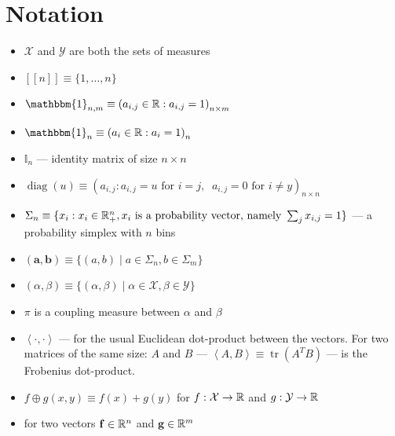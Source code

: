 \section*{Notation}

\begin{itemize}
  \item $\mathcal{X}$ and $\mathcal{Y}$ are both the sets of measures
  \item $[[ n ]] \equiv \{ 1, \ldots, n \}$
  \item $\mathbbm{1}_{n, m} \equiv \left( a_{i,j} \in \R : a_{i,j} = 1 \right)_{n \times m}$
  \item $\mathbbm{1}_{n} \equiv \left( a_{i} \in \R : a_{i} = 1 \right)_{n}$
  \item $\mathbb{I}_n$ --- identity matrix of size $n\times n$
  \item $\operatorname{diag}\left( u \right) \equiv \left( a_{i,j} : a_{i,j} = u \text{ for } i = j , \;\; a_{i,j} = 0 \text{ for } i \neq y \right)_{n \times n}$
  \item $\Sigma_n \equiv \{ x_i : x_i \in \mathbb{R}^{n}_+, x_i \text{ is a probability vector, namely } \sum_j x_{i, j} = 1 \}$ --- a probability simplex with $n$ bins
  \item $\left( \mathbf{a}, \mathbf{b} \right) \equiv \{ \left( a, b \right) \mid a \in \Sigma_n, b \in \Sigma_m  \}  $ 
  \item $\left( \alpha, \beta \right) \equiv \{ \left( \alpha, \beta \right) \mid \alpha \in \mathcal{X}, \beta \in \mathcal{Y} \}$
  \item $\pi$ is a coupling measure between $\alpha$ and $\beta$ 
  \item $\left< \cdot, \cdot \right>$ --- for the usual Euclidean
    dot-product between the vectors. For two matrices of the same size:
    $A$ and $B$ --- $\left<A, B \right> \equiv \operatorname{tr} \left( A^{T} B \right) $ --- is the Frobenius dot-product. 
  \item $f \oplus g (x, y) \equiv f(x) + g(y)$ for  $f: \mathcal{X} \to \mathbb{R}$ and $g: \mathcal{Y} \to \mathbb{R}$
  \item for two vectors $\mathbf{f} \in \mathbb{R}^{n}$ and $\mathbf{g} \in \mathbb{R}^{m}$ 

\end{itemize}
